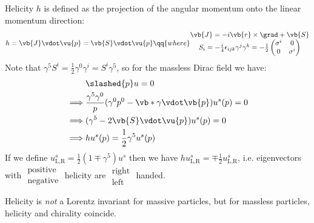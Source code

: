 \documentclass{jknotes}
\begin{document}
Helicity \(h\) is defined as the projection of the angular momentum onto the linear momentum direction:
\begin{equation}
    h = \vb{J}\vdot\vu{p} = \vb{S}\vdot\vu{p} \qq{where}
    \begin{matrix}
        \vb{J} = -i\vb{r}\times\grad+\vb{S} \\
        S_i = -\frac{i}{4}\epsilon_{ijk}\gamma^j\gamma^k = - \frac{1}{2}
        \begin{pmatrix}
            \sigma^i & 0 \\
            0 & \sigma^i
        \end{pmatrix}
    \end{matrix}
\end{equation}
Note that \(\gamma^5S^i = \frac{1}{2}\gamma^0\gamma^i = S^i\gamma^5\), so for the massless Dirac field we have:
\begin{align}
    &\slashed{p} u = 0 \\
    \implies& \frac{\gamma^5\gamma^0}{p}(\gamma^0p^0-\vb*{\gamma}\vdot\vb{p})u^s(p) = 0 \\
    \implies& (\gamma^5 - 2\vb{S}\vdot\vu{p})u^s(p) = 0 \\
    \implies& hu^s(p) = \frac{1}{2}\gamma^5u^s(p)
\end{align}
If we define \(u^s_{\text{L,R}} = \frac{1}{2}(1\mp\gamma^5)u^s\) then we have \(hu^s_{\text{L,R}} = \mp\frac{1}{2}u^s_{\text{L,R}}\), i.e. eigenvectors with \(
\begin{matrix}
    \text{positive} \\ \text{negative}
\end{matrix}
\) helicity are \(
\begin{matrix}
    \text{right} \\ \text{left}
\end{matrix}
\) handed.

Helicity is \emph{not} a Lorentz invariant for massive particles, but for massless particles, helicity and chirality coincide.
\end{document}
